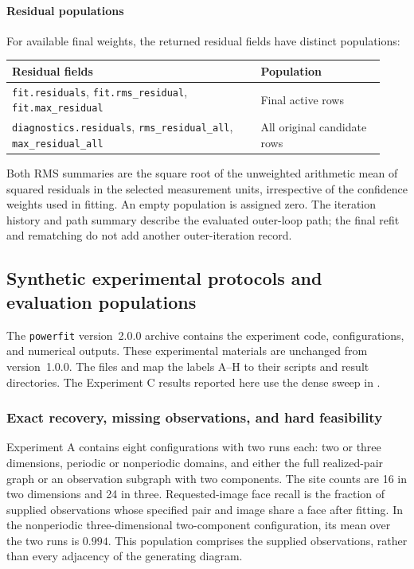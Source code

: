 \paragraph{Residual populations}
For available final weights, the returned residual fields have distinct populations:
\begin{center}
\begin{tabular}{@{}p{0.62\linewidth}p{0.31\linewidth}@{}}
\toprule
Residual fields & Population \\
\midrule
\raggedright\texttt{fit.residuals}, \texttt{fit.rms\_residual}, \texttt{fit.max\_residual} & \raggedright Final active rows \tabularnewline
\raggedright\texttt{diagnostics.residuals}, \texttt{rms\_residual\_all}, \texttt{max\_residual\_all} & \raggedright All original candidate rows \tabularnewline
\bottomrule
\end{tabular}
\end{center}
Both RMS summaries are the square root of the unweighted arithmetic mean of squared residuals in the selected measurement units, irrespective of the confidence weights used in fitting. An empty population is assigned zero. The iteration history and path summary describe the evaluated outer-loop path; the final refit and rematching do not add another outer-iteration record.

\subsection{Synthetic experimental protocols and evaluation populations}
\label{app:numerical-protocols}

The \texttt{powerfit} version~2.0.0 archive \citep{PowerfitArchive2026}
contains the experiment code, configurations, and numerical outputs. These
experimental materials are unchanged from version~1.0.0. The files
 and  map the
labels A--H to their scripts and result directories. The Experiment C
results reported here use the dense sweep in
.

\subsubsection{Exact recovery, missing observations, and hard feasibility}
\label{app:synthetic-controls}

Experiment A contains eight configurations with two runs each: two or three
dimensions, periodic or nonperiodic domains, and either the full realized-pair
graph or an observation subgraph with two components. The site counts are 16
in two dimensions and 24 in three. Requested-image face recall is the fraction
of supplied observations whose specified pair and image share a face after
fitting. In the nonperiodic three-dimensional two-component configuration,
its mean over the two runs is $0.994$. This population comprises the supplied
observations, rather than every adjacency of the generating diagram.

